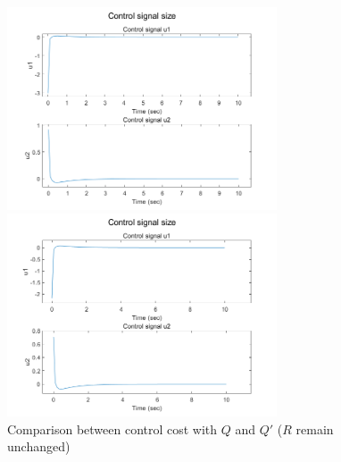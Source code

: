 \documentclass[hyperref]{article}
\theoremstyle{nonumberplain}
\begin{document}
	\begin{figure}[H]
		\centering
		\begin{minipage}[t]{0.48\textwidth}
			\centering
			\includegraphics[width=8cm]{fig17.png}
		\end{minipage}
		\begin{minipage}[t]{0.48\textwidth}
			\centering
			\includegraphics[width=8cm]{fig18.png}
		\end{minipage}
		\caption{Comparison between control cost with $Q$ and ${Q}'$ ($R$ remain unchanged)}
		\label{fig13}
		

\end{figure}
\end{document}
